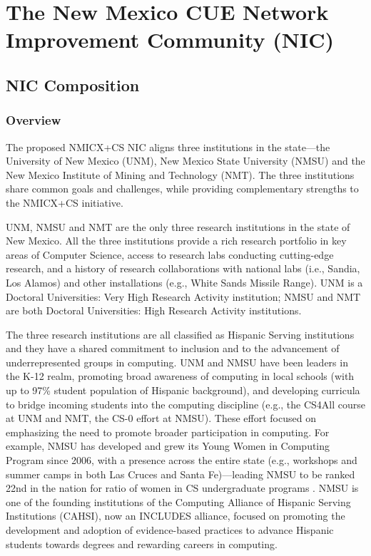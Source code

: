\section{The New Mexico CUE Network Improvement Community (NIC)}
\label{sec:consortium}

\subsection{NIC Composition}

\subsubsection{Overview}
The proposed NMICX+CS NIC aligns  three  institutions in the state---the University of New Mexico (UNM), New Mexico State University (NMSU) and the New Mexico Institute of Mining and Technology (NMT). The three institutions share common goals and challenges, while providing complementary strengths to the NMICX+CS initiative. 

UNM, NMSU and NMT are the only three research institutions in the state of New Mexico. All the three institutions provide a rich research portfolio in key areas of Computer Science, access to research labs conducting cutting-edge research, and a history of research collaborations with national labs (i.e., Sandia, Los Alamos) and other installations (e.g., White Sands Missile Range). UNM is a 
Doctoral Universities: Very High Research Activity institution;
NMSU and NMT are both Doctoral Universities: High Research Activity institutions. 

The three research institutions are all classified as Hispanic Serving institutions and they have a shared commitment to inclusion and to the advancement of underrepresented groups in computing. UNM and NMSU have been leaders in the K-12 realm, promoting broad awareness of computing in local schools (with up to 97\% student population of Hispanic background), and developing curricula to bridge incoming students into the computing discipline (e.g., the CS4All course at UNM and NMT, the CS-0 effort at NMSU). These effort focused on emphasizing the need to promote broader participation in computing. For example, NMSU has developed and grew its Young Women in Computing Program since 2006, with a presence across the entire state (e.g., workshops and summer camps in both Las Cruces and Santa Fe)---leading NMSU to be ranked 22nd in the nation for ratio of women in CS  undergraduate programs \cite{chronicle}. NMSU is one of the founding institutions of the Computing Alliance of Hispanic Serving Institutions (CAHSI), now an INCLUDES alliance, focused on promoting the development and adoption of evidence-based practices to advance Hispanic students towards degrees and rewarding careers in computing. 

